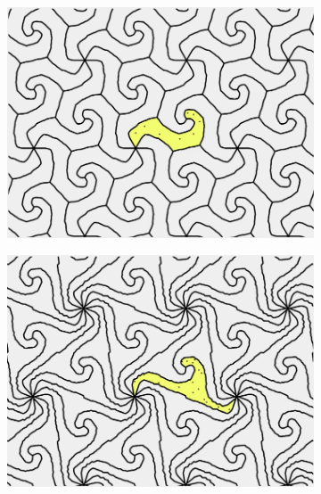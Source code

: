 \documentclass[11pt]{article}
\begin{document}
\begin{figure}[H]
\begin{subfigure}[b]{0.33\textwidth}
  \end{subfigure}

\quad

  \begin{subfigure}[b]{0.33\textwidth}
    \includegraphics[width=.9\textwidth]{sl3.png}

  \end{subfigure}
  \begin{subfigure}[b]{0.33\textwidth}
    \includegraphics[width=.9\textwidth]{sl4.png}


\end{subfigure}
\end{figure}
\end{document}
